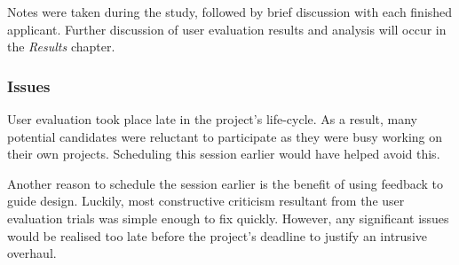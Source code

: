 Notes were taken during the study, followed by brief discussion with each finished applicant. Further discussion of user evaluation results and analysis will occur in the \emph{Results} chapter.

\subsubsection{Issues}
User evaluation took place late in the project's life-cycle. As a result, many potential candidates were reluctant to participate as they were busy working on their own projects.
Scheduling this session earlier would have helped avoid this.

Another reason to schedule the session earlier is the benefit of using feedback to guide design.
Luckily, most constructive criticism resultant from the user evaluation trials was simple enough to fix quickly.
However, any significant issues would be realised too late before the project's deadline to justify an intrusive overhaul.
\afterpage{
  \clearpage
  \begin{landscape}
    
  \end{landscape}
  \clearpage
  \begin{landscape}
    

  \end{landscape}
}
